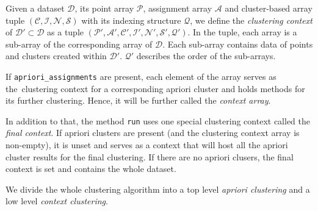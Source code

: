 \begin{defn}
	Given a dataset $\mathcal{D}$, its point array $\mathcal{P}$, assignment array $\mathcal{A}$ and cluster-based array tuple $(\mathcal{C},\mathcal{I},\mathcal{N},\mathcal{S})$ with its indexing structure $\mathcal{Q}$, we define the \emph{clustering context} of $\mathcal{D}' \subset \mathcal{D}$ as a tuple $(\mathcal{P'},\mathcal{A'},\mathcal{C'},\mathcal{I'},\mathcal{N'},\mathcal{S'},\mathcal{Q}')$. In the tuple, each array is a sub-array of the corresponding array of $\mathcal{D}$. Each sub-array contains data of points and clusters created within $\mathcal{D}'$. $\mathcal{Q}'$ describes the order of the sub-arrays.
	\label{def03:context}
\end{defn}

 If \texttt{apriori\_assignments} are present, each element of the array serves as the~clustering context for a corresponding apriori cluster and holds methods for its further clustering. Hence, it will be further called the \emph{context array}. 

In addition to that, the method \texttt{run} uses one special clustering context called the \emph{final context}. If apriori clusters are present (and the clustering context array is non-empty), it is unset and serves as a context that will host all the apriori cluster results for the final clustering. If there are no apriori clusers, the final context is set and contains the whole dataset.

We divide the whole clustering algorithm into a top level \emph{apriori clustering} and a low level \emph{context clustering}.

